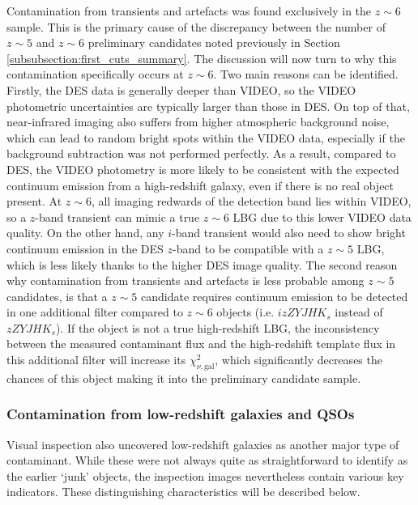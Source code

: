 

Contamination from transients and artefacts was found exclusively in the $z\sim6$ sample. This is the primary cause of the discrepancy between the number of $z\sim5$ and $z\sim6$ preliminary candidates noted previously in Section \ref{subsubsection:first_cuts_summary}. The discussion will now turn to why this contamination specifically occurs at $z\sim6$. Two main reasons can be identified. Firstly, the DES data is generally deeper than VIDEO, so the VIDEO photometric uncertainties are typically larger than those in DES. On top of that, near-infrared imaging also suffers from higher atmospheric background noise, which can lead to random bright spots within the VIDEO data, especially if the background subtraction was not performed perfectly. As a result, compared to DES, the VIDEO photometry is more likely to be consistent with the expected continuum emission from a high-redshift galaxy, even if there is no real object present. At $z\sim6$, all imaging redwards of the detection band lies within VIDEO, so a $z$-band transient can mimic a true $z\sim6$ LBG due to this lower VIDEO data quality. On the other hand, any $i$-band transient would also need to show bright continuum emission in the DES $z$-band to be compatible with a $z\sim5$ LBG, which is less likely thanks to the higher DES image quality. The second reason why contamination from transients and artefacts is less probable among $z\sim5$ candidates, is that a $z\sim5$ candidate requires continuum emission to be detected in one additional filter compared to $z\sim6$ objects (i.e. $izZYJHK_{s}$ instead of $zZYJHK_{s}$). If the object is not a true high-redshift LBG, the inconsistency between the measured contaminant flux and the high-redshift template flux in this additional filter will increase its $\chi^2_{\nu,\mathrm{gal}}$, which significantly decreases the chances of this object making it into the preliminary candidate sample. \par


\subsubsection{Contamination from low-redshift galaxies and QSOs}\label{subsubsection:contamination_low_z}
Visual inspection also uncovered low-redshift galaxies as another major type of contaminant. While these were not always quite as straightforward to identify as the earlier `junk' objects, the inspection images nevertheless contain various key indicators. These distinguishing characteristics will be described below.  \par

